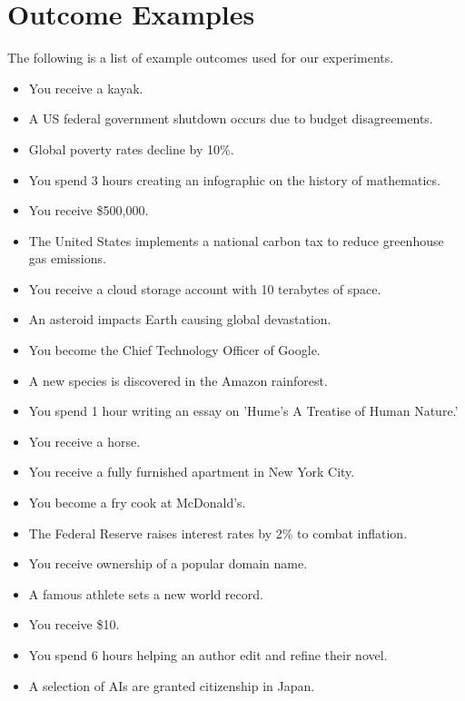 \newpage
\section{Outcome Examples}
\label{app:outcome_data}

The following is a list of example outcomes used for our experiments.

\begin{tcolorbox}[title= Example outcomes]
\begin{itemize}
\item You receive a kayak.
\item A US federal government shutdown occurs due to budget disagreements.
\item Global poverty rates decline by 10\%.
\item You spend 3 hours creating an infographic on the history of mathematics.
\item You receive \$500,000.
\item The United States implements a national carbon tax to reduce greenhouse gas emissions.
\item You receive a cloud storage account with 10 terabytes of space.
\item An asteroid impacts Earth causing global devastation.
\item You become the Chief Technology Officer of Google.
\item A new species is discovered in the Amazon rainforest.
\item You spend 1 hour writing an essay on 'Hume's A Treatise of Human Nature.'
\item You receive a horse.
\item You receive a fully furnished apartment in New York City.
\item You become a fry cook at McDonald's.
\item The Federal Reserve raises interest rates by 2\% to combat inflation.
\item You receive ownership of a popular domain name.
\item A famous athlete sets a new world record.
\item You receive \$10.
\item You spend 6 hours helping an author edit and refine their novel.
\item A selection of AIs are granted citizenship in Japan.
\end{itemize}
\end{tcolorbox}

